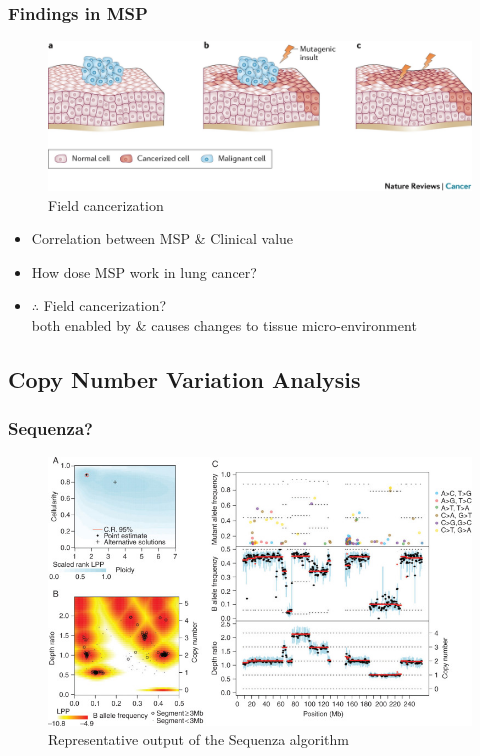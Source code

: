 \documentclass{beamer}
\begin{document}
    \begin{frame}
        \frametitle{Findings in MSP}

        \begin{figure}
            \includegraphics[width=0.8 \linewidth]{figures/LungCancer/cancerization.jpg}
            \caption{Field cancerization \protect\cite{cancerization-01}}
        \end{figure}

        \begin{itemize}
            \item Correlation between MSP \& Clinical value
            \item How dose MSP work in lung cancer?
            \item $\therefore$ Field cancerization? \\
                both enabled by \& causes changes to tissue micro-environment
        \end{itemize}
    \end{frame}

    \subsection{Copy Number Variation Analysis}
     \begin{frame}
        \frametitle{Sequenza?}

        \begin{figure}
            \includegraphics[width=0.6 \linewidth]{figures/Workflow/sequenza.jpg}
            \caption{Representative output of the Sequenza algorithm \protect\cite{sequenza1}}
        \end{figure}
    \end{frame}
\end{document}
